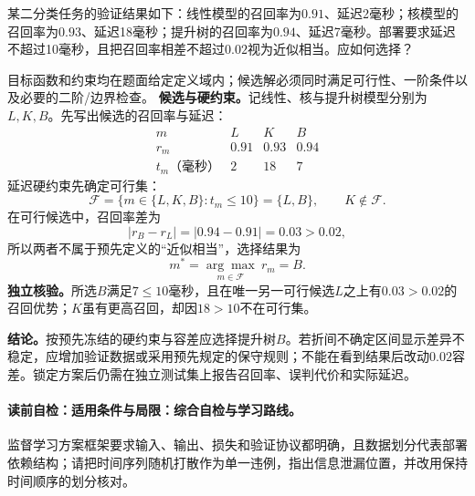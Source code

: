 \label{struct:V3-C07-CH18}
\label{struct:V3-C07-CH32}
\begin{example}[代价与资源共同约束下的方法选择]\label{exm:V3-C07-selection}
某二分类任务的验证结果如下：线性模型的召回率为$0.91$、延迟2毫秒；核模型的召回率为$0.93$、延迟18毫秒；提升树的召回率为$0.94$、延迟7毫秒。部署要求延迟不超过10毫秒，且把召回率相差不超过$0.02$视为近似相当。应如何选择？

\label{struct:V3-C07-CH33}
\end{example}
\begin{solution}
\SolGiven 目标函数和约束均在题面给定定义域内；候选解必须同时满足可行性、一阶条件以及必要的二阶/边界检查。
\SolDerive
\textbf{候选与硬约束。}记线性、核与提升树模型分别为$L,K,B$。先写出候选的召回率与延迟：
\[
\begin{array}{c|ccc}
m&L&K&B\\ \hline
r_m&0.91&0.93&0.94\\
t_m\text{（毫秒）}&2&18&7
\end{array}
\]
延迟硬约束先确定可行集：
\[
\mathcal F
=\{m\in\{L,K,B\}:t_m\leq 10\}
=\{L,B\},
\qquad K\notin\mathcal F.
\]
在可行候选中，召回率差为
\[
|r_B-r_L|=|0.94-0.91|=0.03>0.02,
\]
所以两者不属于预先定义的“近似相当”，选择结果为
\[
m^*=\underset{m\in\mathcal F}{\arg\max}\ r_m=B.
\]
\textbf{独立核验。}所选$B$满足$7\le10$毫秒，且在唯一另一可行候选$L$之上有$0.03>0.02$的召回优势；$K$虽有更高召回，却因$18>10$不在可行集。

\textbf{结论。}按预先冻结的硬约束与容差应选择提升树$B$。若折间不确定区间显示差异不稳定，应增加验证数据或采用预先规定的保守规则；不能在看到结果后改动$0.02$容差。锁定方案后仍需在独立测试集上报告召回率、误判代价和实际延迟。
\end{solution}

\label{struct:V3-C07-CH28}
\paragraph{读前自检：适用条件与局限：综合自检与学习路线。}监督学习方案框架要求输入、输出、损失和验证协议都明确，且数据划分代表部署依赖结构；请把时间序列随机打散作为单一违例，指出信息泄漏位置，并改用保持时间顺序的划分核对。\par


